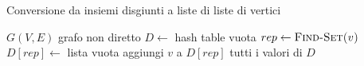 \begin{enumerate}
\begin{enumerate}[resume]
                        \begin{algorithm}
                              \caption{Conversione da insiemi disgiunti a liste di liste di vertici}\label{conversion}
                              \begin{algorithmic}[1]
                                    \ENSURE $G(V,E)$ grafo non diretto
                                    \STATE $D\leftarrow$ hash table vuota
                                    \STATE $rep \leftarrow \textsc{Find-Set($v$)}$
                                    \STATE $D[rep]\leftarrow$ lista vuota
                                    \ENDIF
                                    \STATE aggiungi $v$ a $D[rep]$
                                    \ENDFOR
                                    \RETURN tutti i valori di $D$
                              \end{algorithmic}
                        \end{algorithm}


\end{enumerate}
\end{enumerate}
